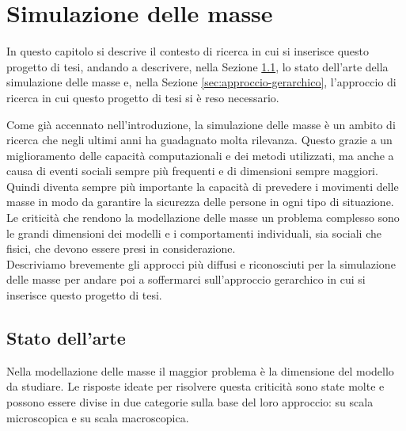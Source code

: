 \chapter{Simulazione delle masse}
In questo capitolo si descrive il contesto di ricerca in cui si inserisce questo progetto di tesi, andando a descrivere, nella Sezione \ref{sec:stato-dell-arte}, lo stato dell'arte della simulazione delle masse e, nella Sezione \ref{sec:approccio-gerarchico}, l'approccio di ricerca in cui questo progetto di tesi si è reso necessario.

\label{sec:simulazione-masse}
Come già accennato nell'introduzione, la simulazione delle masse è un ambito di ricerca che negli ultimi anni ha guadagnato molta rilevanza. Questo grazie a un miglioramento delle capacità computazionali e dei metodi utilizzati, ma anche a causa di eventi sociali sempre più frequenti e di dimensioni sempre maggiori. Quindi diventa sempre più importante la capacità di prevedere i movimenti delle masse in modo da garantire la sicurezza delle persone in ogni tipo di situazione.\\
Le criticità che rendono la modellazione delle masse un problema complesso sono le grandi dimensioni dei modelli e i comportamenti individuali, sia sociali che fisici, che devono essere presi in considerazione.\\
Descriviamo brevemente gli approcci più diffusi e riconosciuti per la simulazione delle masse per andare poi a soffermarci sull'approccio gerarchico in cui si inserisce questo progetto di tesi.

\section{Stato dell'arte}
\label{sec:stato-dell-arte}
Nella modellazione delle masse il maggior problema è la dimensione del modello da studiare. Le risposte ideate per risolvere questa criticità sono state molte e possono essere divise in due categorie sulla base del loro approccio: su scala microscopica e su scala macroscopica.\\

